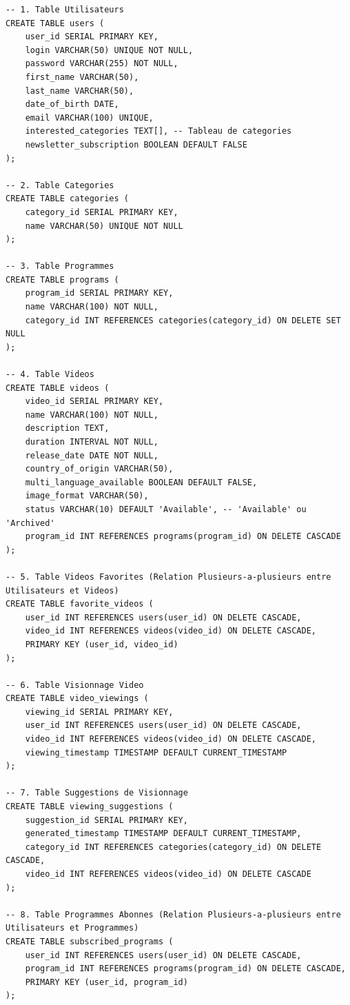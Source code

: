 \documentclass[a4paper, 12pt]{article}
\begin{document}
\begin{lstlisting}
-- 1. Table Utilisateurs
CREATE TABLE users (
    user_id SERIAL PRIMARY KEY,
    login VARCHAR(50) UNIQUE NOT NULL,
    password VARCHAR(255) NOT NULL,
    first_name VARCHAR(50),
    last_name VARCHAR(50),
    date_of_birth DATE,
    email VARCHAR(100) UNIQUE,
    interested_categories TEXT[], -- Tableau de categories
    newsletter_subscription BOOLEAN DEFAULT FALSE
);

-- 2. Table Categories
CREATE TABLE categories (
    category_id SERIAL PRIMARY KEY,
    name VARCHAR(50) UNIQUE NOT NULL
);

-- 3. Table Programmes
CREATE TABLE programs (
    program_id SERIAL PRIMARY KEY,
    name VARCHAR(100) NOT NULL,
    category_id INT REFERENCES categories(category_id) ON DELETE SET NULL
);

-- 4. Table Videos
CREATE TABLE videos (
    video_id SERIAL PRIMARY KEY,
    name VARCHAR(100) NOT NULL,
    description TEXT,
    duration INTERVAL NOT NULL,
    release_date DATE NOT NULL,
    country_of_origin VARCHAR(50),
    multi_language_available BOOLEAN DEFAULT FALSE,
    image_format VARCHAR(50),
    status VARCHAR(10) DEFAULT 'Available', -- 'Available' ou 'Archived'
    program_id INT REFERENCES programs(program_id) ON DELETE CASCADE
);

-- 5. Table Videos Favorites (Relation Plusieurs-a-plusieurs entre Utilisateurs et Videos)
CREATE TABLE favorite_videos (
    user_id INT REFERENCES users(user_id) ON DELETE CASCADE,
    video_id INT REFERENCES videos(video_id) ON DELETE CASCADE,
    PRIMARY KEY (user_id, video_id)
);

-- 6. Table Visionnage Video
CREATE TABLE video_viewings (
    viewing_id SERIAL PRIMARY KEY,
    user_id INT REFERENCES users(user_id) ON DELETE CASCADE,
    video_id INT REFERENCES videos(video_id) ON DELETE CASCADE,
    viewing_timestamp TIMESTAMP DEFAULT CURRENT_TIMESTAMP
);

-- 7. Table Suggestions de Visionnage
CREATE TABLE viewing_suggestions (
    suggestion_id SERIAL PRIMARY KEY,
    generated_timestamp TIMESTAMP DEFAULT CURRENT_TIMESTAMP,
    category_id INT REFERENCES categories(category_id) ON DELETE CASCADE,
    video_id INT REFERENCES videos(video_id) ON DELETE CASCADE
);

-- 8. Table Programmes Abonnes (Relation Plusieurs-a-plusieurs entre Utilisateurs et Programmes)
CREATE TABLE subscribed_programs (
    user_id INT REFERENCES users(user_id) ON DELETE CASCADE,
    program_id INT REFERENCES programs(program_id) ON DELETE CASCADE,
    PRIMARY KEY (user_id, program_id)
);
\end{lstlisting}
\end{document}
